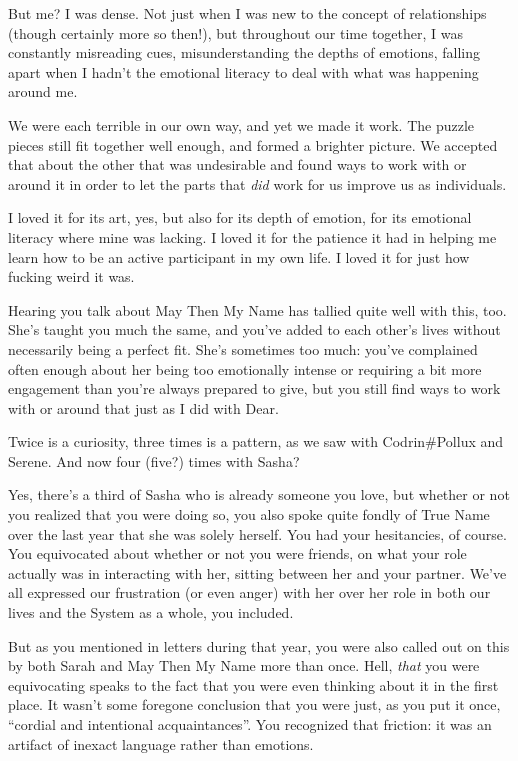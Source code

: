 But me? I was dense. Not just when I was new to the concept of relationships (though certainly more so then!), but throughout our time together, I was constantly misreading cues, misunderstanding the depths of emotions, falling apart when I hadn't the emotional literacy to deal with what was happening around me.

We were each terrible in our own way, and yet we made it work. The puzzle pieces still fit together well enough, and formed a brighter picture. We accepted that about the other that was undesirable and found ways to work with or around it in order to let the parts that \emph{did} work for us improve us as individuals.

I loved it for its art, yes, but also for its depth of emotion, for its emotional literacy where mine was lacking. I loved it for the patience it had in helping me learn how to be an active participant in my own life. I loved it for just how fucking weird it was.

Hearing you talk about May Then My Name has tallied quite well with this, too. She's taught you much the same, and you've added to each other's lives without necessarily being a perfect fit. She's sometimes too much: you've complained often enough about her being too emotionally intense or requiring a bit more engagement than you're always prepared to give, but you still find ways to work with or around that just as I did with Dear.

Twice is a curiosity, three times is a pattern, as we saw with Codrin\#Pollux and Serene. And now four (five?) times with Sasha?

Yes, there's a third of Sasha who is already someone you love, but whether or not you realized that you were doing so, you also spoke quite fondly of True Name over the last year that she was solely herself. You had your hesitancies, of course. You equivocated about whether or not you were friends, on what your role actually was in interacting with her, sitting between her and your partner. We've all expressed our frustration (or even anger) with her over her role in both our lives and the System as a whole, you included.

But as you mentioned in letters during that year, you were also called out on this by both Sarah and May Then My Name more than once. Hell, \emph{that} you were equivocating speaks to the fact that you were even thinking about it in the first place. It wasn't some foregone conclusion that you were just, as you put it once, ``cordial and intentional acquaintances''. You recognized that friction: it was an artifact of inexact language rather than emotions.

